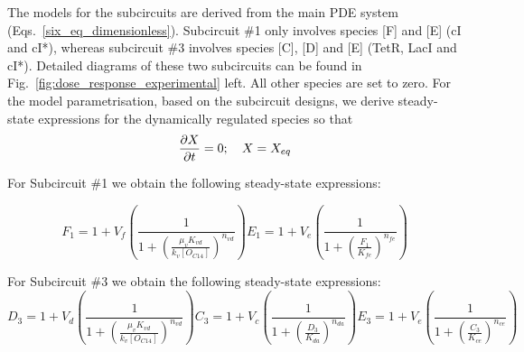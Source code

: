 The models for the subcircuits are derived from the main PDE system (Eqs.~\ref{six_eq_dimensionless}).
Subcircuit \#1 only involves species [F] and [E] (cI and cI*), whereas subcircuit \#3 involves species [C], [D] and [E]
(TetR, LacI and cI*).
Detailed diagrams of these two subcircuits can be found in Fig.~\ref{fig:dose_response_experimental} left.
All other species are set to zero.
For the model parametrisation, based on the subcircuit designs,
we derive steady-state expressions for the dynamically regulated species so that
\begin{equation}
    \pdv{X}{t}=0; \quad X=X_{eq}
\end{equation}

For Subcircuit \#1 we obtain the following steady-state expressions:

\begin{subequations}\label{Subcircuit 1 equations}
\begin{equation}
    F_1 = 1 + V_f \left( \frac{1}{1+ \left( \frac{\mu_v K_{vd}}{k_v [O_{C14}]} \right)^{n_{vd}}} \right)
\end{equation}
\begin{equation}
    E_1 = 1 + V_e \left( \frac{1}{1+ \left( \frac{F_1}{K_{fe}} \right)^{n_{fe}}} \right)
\end{equation}
\end{subequations}

For Subcircuit \#3 we obtain the following steady-state expressions:
\begin{subequations}\label{Subcircuit 3 equations}
\begin{equation}
    D_3 = 1 + V_d \left( \frac{1}{1+ \left( \frac{\mu_v K_{vd}}{k_v [O_{C14}]} \right)^{n_{vd}}} \right)
\end{equation}
\begin{equation}
    C_3 = 1 + V_c \left( \frac{1}{1+ \left( \frac{D_3}{K_{da}} \right)^{n_{da}}} \right)
\end{equation}
\begin{equation}
    E_3 = 1 + V_e \left( \frac{1}{1+ \left( \frac{C_3}{K_{ce}} \right)^{n_{ce}}} \right)
\end{equation}
\end{subequations}

